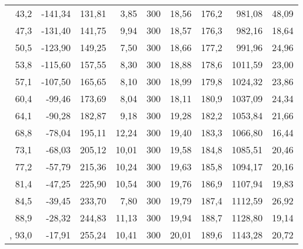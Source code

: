 \begin{table}[htpb]
\begin{tabular}{rrrr|rrrr|r}
		43,2	&	-141,34	&	131,81	&	3,85	&	300	&	18,56	&	176,2	&	981,08	&	48,09	\\
		47,3	&	-131,40	&	141,75	&	9,94	&	300	&	18,57	&	176,3	&	982,16	&	18,64	\\
		50,5	&	-123,90	&	149,25	&	7,50	&	300	&	18,66	&	177,2	&	991,96	&	24,96	\\
		53,8	&	-115,60	&	157,55	&	8,30	&	300	&	18,88	&	178,6	&	1011,59	&	23,00	\\
		57,1	&	-107,50	&	165,65	&	8,10	&	300	&	18,99	&	179,8	&	1024,32	&	23,86	\\
		60,4	&	-99,46	&	173,69	&	8,04	&	300	&	18,11	&	180,9	&	1037,09	&	24,34	\\
		64,1	&	-90,28	&	182,87	&	9,18	&	300	&	19,28	&	182,2	&	1053,84	&	21,66	\\
		68,8	&	-78,04	&	195,11	&	12,24	&	300	&	19,40	&	183,3	&	1066,80	&	16,44	\\
		73,1	&	-68,03	&	205,12	&	10,01	&	300	&	19,58	&	184,8	&	1085,51 &	20,46	\\
		77,2	&	-57,79	&	215,36	&	10,24	&	300	&	19,63	&	185,8	&	1094,17	&	20,16	\\
		81,4	&	-47,25	&	225,90	&	10,54	&	300	&	19,76	&	186,9	&	1107,94	&   19,83	\\
		84,5	&	-39,45	&	233,70	&	7,80	&	300	&	19,79	&	187,4	&	1112,59	&	26,92	\\
		88,9	&	-28,32	&	244,83	&	11,13	&	300	&	19,94	&	188,7	&	1128,80	&	19,14	\\,
		93,0	&	-17,91	&	255,24	&	10,41	&	300	&	20,01	&	189,6	&	1143,28	&	20,72	\\
		\bottomrule
	\end{tabular}
\end{table}

